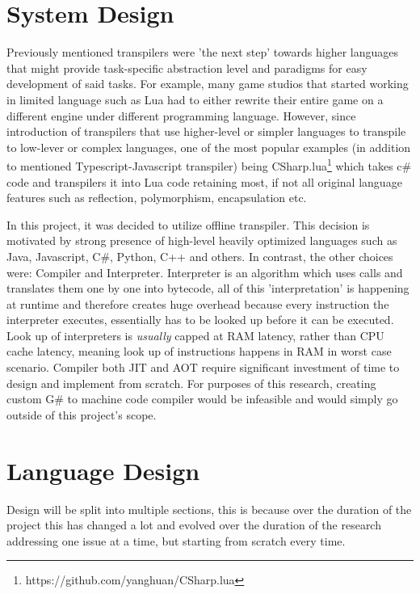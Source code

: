 \documentclass{article}
\begin{document}
\section{System Design}
Previously mentioned transpilers were 'the next step' towards higher languages that might provide task-specific abstraction level and paradigms for easy development of said tasks.\citep*{gribova_2013_ontology} For example, many game studios that started working in limited language such as Lua had to either rewrite their entire game on a different engine under different programming language. However, since introduction of transpilers that use higher-level or simpler languages to transpile to low-lever or complex languages, one of the most popular examples (in addition to mentioned Typescript-Javascript transpiler) being CSharp.lua\footnote{https://github.com/yanghuan/CSharp.lua} which takes c\# code and transpilers it into Lua code retaining most, if not all original language features such as reflection, polymorphism, encapsulation etc.

In this project, it was decided to utilize offline transpiler. This decision is motivated by strong presence of high-level heavily optimized languages such as Java, Javascript, C\#, Python, C++ and others. In contrast, the other choices were: Compiler and Interpreter.
Interpreter is an algorithm which uses calls and translates them one by one into bytecode, all of this 'interpretation' is happening at runtime and therefore creates huge overhead because every instruction the interpreter executes, essentially has to be looked up before it can be executed. Look up of interpreters is \textit{usually} capped at RAM latency, rather than CPU cache latency, meaning look up of instructions happens in RAM in worst case scenario.
Compiler both JIT and AOT require significant investment of time to design and implement from scratch. For purposes of this research, creating custom G\# to machine code compiler would be infeasible and would simply go outside of this project's scope.








\section{Language Design}
\label{sec:landes}
Design will be split into multiple sections, this is because over the duration of the project this has changed a lot and evolved over the duration of the research addressing one issue at a time, but starting from scratch every time.
\end{document}
